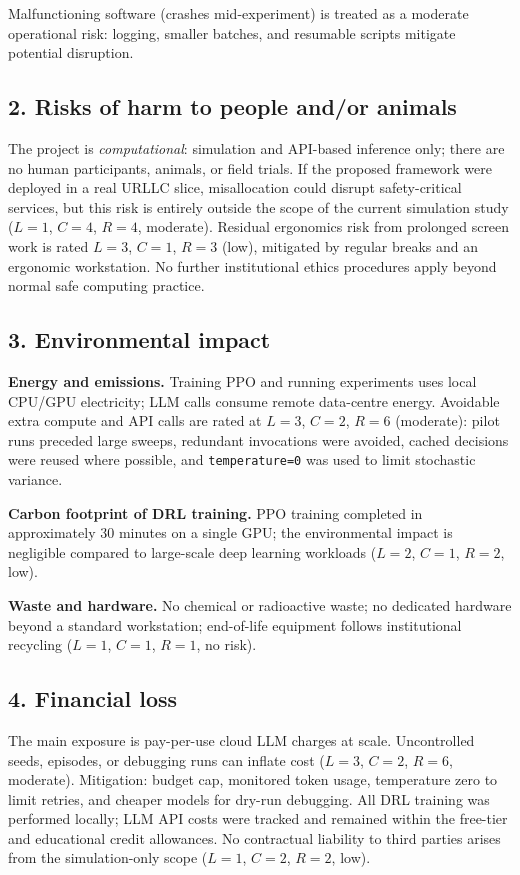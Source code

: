 Malfunctioning software (crashes mid-experiment) is treated as a moderate
operational risk: logging, smaller batches, and resumable scripts mitigate
potential disruption.

\subsection*{2. Risks of harm to people and/or animals}

The project is \emph{computational}: simulation and API-based inference only;
there are no human participants, animals, or field trials. If the proposed
framework were deployed in a real URLLC slice, misallocation could disrupt
safety-critical services, but this risk is entirely outside the scope of the
current simulation study ($L{=}1$, $C{=}4$, $R{=}4$, moderate). Residual
ergonomics risk from prolonged screen work is rated $L{=}3$, $C{=}1$, $R{=}3$
(low), mitigated by regular breaks and an ergonomic workstation. No further
institutional ethics procedures apply beyond normal safe computing practice.

\subsection*{3. Environmental impact}

\textbf{Energy and emissions.} Training PPO and running experiments uses local
CPU/GPU electricity; LLM calls consume remote data-centre energy. Avoidable
extra compute and API calls are rated at $L{=}3$, $C{=}2$, $R{=}6$ (moderate):
pilot runs preceded large sweeps, redundant invocations were avoided, cached
decisions were reused where possible, and \texttt{temperature=0} was used to
limit stochastic variance.

\textbf{Carbon footprint of DRL training.} PPO training completed in
approximately 30 minutes on a single GPU; the environmental impact is
negligible compared to large-scale deep learning workloads ($L{=}2$, $C{=}1$,
$R{=}2$, low).

\textbf{Waste and hardware.} No chemical or radioactive waste; no dedicated
hardware beyond a standard workstation; end-of-life equipment follows
institutional recycling ($L{=}1$, $C{=}1$, $R{=}1$, no risk).

\subsection*{4. Financial loss}

The main exposure is pay-per-use cloud LLM charges at scale. Uncontrolled
seeds, episodes, or debugging runs can inflate cost ($L{=}3$, $C{=}2$, $R{=}6$,
moderate). Mitigation: budget cap, monitored token usage, temperature zero to
limit retries, and cheaper models for dry-run debugging. All DRL training was
performed locally; LLM API costs were tracked and remained within the free-tier
and educational credit allowances. No contractual liability to third parties
arises from the simulation-only scope ($L{=}1$, $C{=}2$, $R{=}2$, low).

